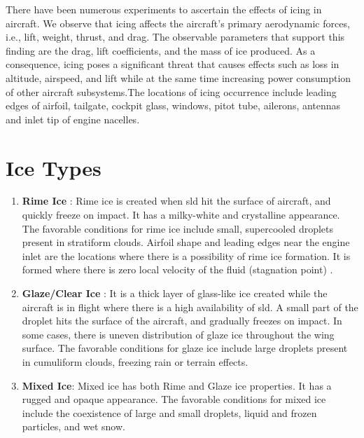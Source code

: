 \documentclass[english]{kththesis}
\begin{document}
There have been numerous experiments to ascertain the effects of icing in aircraft. We observe that icing affects the aircraft's primary aerodynamic forces, i.e., lift, weight, thrust, and drag. The observable parameters that support this finding are the drag, lift coefficients, and the mass of ice produced. As a consequence, icing poses a significant threat that causes effects such as loss in altitude, airspeed, and lift while at the same time increasing power consumption of other aircraft subsystems.The locations of icing occurrence include leading edges of airfoil, tailgate, cockpit glass, windows, pitot tube, ailerons, antennas and inlet tip of engine nacelles.

\section{Ice Types}
\label{sec:icetypes}
\begin{enumerate}
\item \textbf{Rime Ice} : Rime ice is created when \acrshort{sld} hit the surface of aircraft, and quickly freeze on impact. It has a milky-white and crystalline appearance. The favorable conditions for rime ice include small, supercooled droplets present in stratiform clouds. Airfoil shape and leading edges near the engine inlet are the locations where there is a possibility of rime ice formation. It is formed where there is zero local velocity of the fluid (stagnation point) \cite{WikiIcing}.
\item  \textbf{Glaze/Clear Ice} : It is a thick layer of glass-like ice created while the aircraft is in flight where there is a high availability of \acrshort{sld}. A small part of the droplet hits the surface of the aircraft, and gradually freezes on impact. In some cases, there is uneven distribution of glaze ice throughout the wing surface. The favorable conditions for glaze ice include large droplets present in cumuliform clouds, freezing rain or terrain effects. \cite{icinghazard}
\item \textbf{Mixed Ice}: Mixed ice has both Rime and Glaze ice properties. It has a rugged and opaque appearance. The favorable conditions for mixed ice include the coexistence of large and small droplets, liquid and frozen particles, and wet snow.
\end{enumerate}
\end{document}
